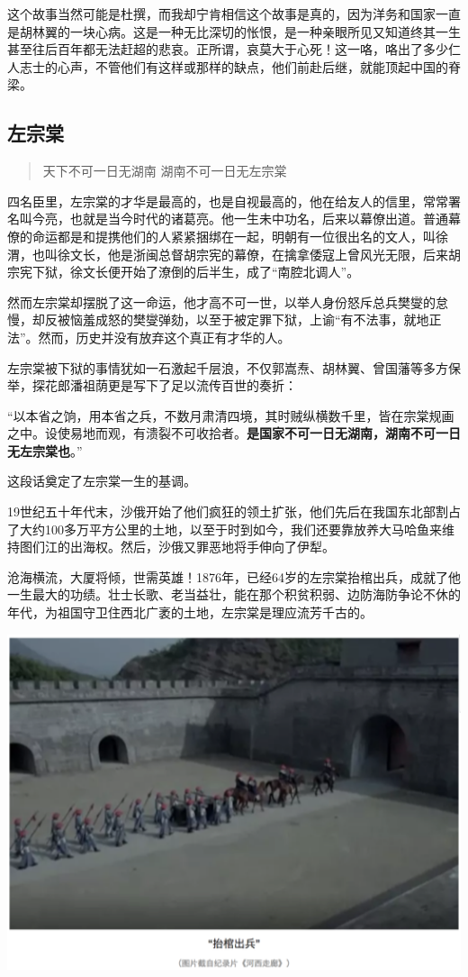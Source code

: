 \documentclass[]{book}
\begin{document}
这个故事当然可能是杜撰，而我却宁肯相信这个故事是真的，因为洋务和国家一直是胡林翼的一块心病。这是一种无比深切的怅恨，是一种亲眼所见又知道终其一生甚至往后百年都无法赶超的悲哀。正所谓，哀莫大于心死！这一咯，咯出了多少仁人志士的心声，不管他们有这样或那样的缺点，他们前赴后继，就能顶起中国的脊梁。

\subsection{左宗棠}

\begin{quote}
天下不可一日无湖南 湖南不可一日无左宗棠
\end{quote}

四名臣里，左宗棠的才华是最高的，也是自视最高的，他在给友人的信里，常常署名叫今亮，也就是当今时代的诸葛亮。他一生未中功名，后来以幕僚出道。普通幕僚的命运都是和提携他们的人紧紧捆绑在一起，明朝有一位很出名的文人，叫徐渭，也叫徐文长，他是浙闽总督胡宗宪的幕僚，在擒拿倭寇上曾风光无限，后来胡宗宪下狱，徐文长便开始了潦倒的后半生，成了``南腔北调人''。

然而左宗棠却摆脱了这一命运，他才高不可一世，以举人身份怒斥总兵樊燮的怠慢，却反被恼羞成怒的樊燮弹劾，以至于被定罪下狱，上谕``有不法事，就地正法''。然而，历史并没有放弃这个真正有才华的人。

左宗棠被下狱的事情犹如一石激起千层浪，不仅郭嵩焘、胡林翼、曾国藩等多方保举，探花郎潘祖荫更是写下了足以流传百世的奏折：

``以本省之饷，用本省之兵，不数月肃清四境，其时贼纵横数千里，皆在宗棠规画之中。设使易地而观，有溃裂不可收拾者。\textbf{是国家不可一日无湖南，湖南不可一日无左宗棠也}。''

这段话奠定了左宗棠一生的基调。

19世纪五十年代末，沙俄开始了他们疯狂的领土扩张，他们先后在我国东北部割占了大约100多万平方公里的土地，以至于时到如今，我们还要靠放养大马哈鱼来维持图们江的出海权。然后，沙俄又罪恶地将手伸向了伊犁。

沧海横流，大厦将倾，世需英雄！1876年，已经64岁的左宗棠抬棺出兵，成就了他一生最大的功绩。壮士长歌、老当益壮，能在那个积贫积弱、边防海防争论不休的年代，为祖国守卫住西北广袤的土地，左宗棠是理应流芳千古的。

\includegraphics[width=6.67in]{images/his2}
\end{document}
